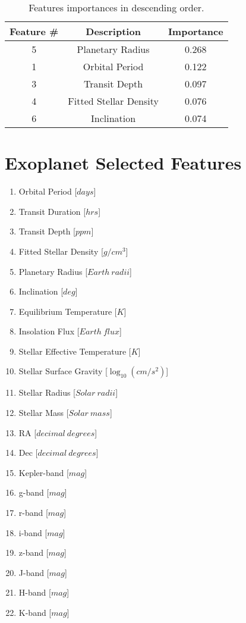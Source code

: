 \documentclass[11pt, a4paper]{article}
\begin{document}
  \begin{table}
    \centering
    \begin{tabular}{|c c c|}
    \hline
    Feature \# & Description & Importance \\
    \hline\hline
    5 & Planetary Radius & 0.268 \\
    1 & Orbital Period & 0.122 \\
    3 & Transit Depth & 0.097 \\
    4 & Fitted Stellar Density & 0.076 \\
    6 & Inclination & 0.074 \\
    \hline
    \end{tabular}
    \caption{Features importances in descending order.}
    \label{table:importances}
  \end{table}

\appendix
\appendixpage

\section{Exoplanet Selected Features}
  \label{appendix:features}
  \begin{enumerate}
    \item Orbital Period [$days$]
    \item Transit Duration [$hrs$]
    \item Transit Depth [$ppm$]
    \item Fitted Stellar Density [$g/cm^{3}$]
    \item Planetary Radius [$Earth\:radii$]
    \item Inclination [$deg$]
    \item Equilibrium Temperature [$K$]
    \item Insolation Flux [$Earth\:flux$]
    \item Stellar Effective Temperature [$K$]
    \item Stellar Surface Gravity [$\log_{10}(cm/s^{2})$]
    \item Stellar Radius [$Solar\:radii$]
    \item Stellar Mass [$Solar\:mass$]
    \item RA [$decimal\:degrees$]
    \item Dec [$decimal\:degrees$]
    \item Kepler-band [$mag$]
    \item g-band [$mag$]
    \item r-band [$mag$]
    \item i-band [$mag$]
    \item z-band [$mag$]
    \item J-band [$mag$]
    \item H-band [$mag$]
    \item K-band [$mag$]
  \end{enumerate}
\end{document}
